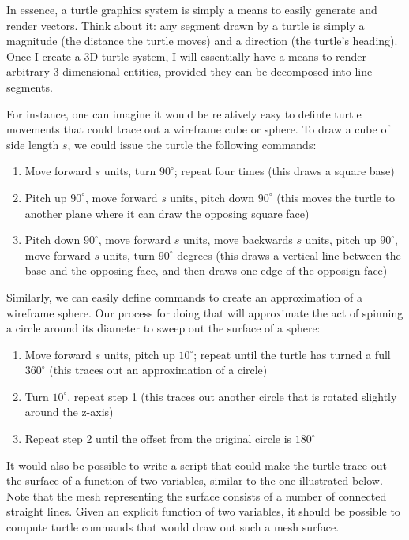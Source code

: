 \documentclass[12pt]{article}
\begin{document}
In essence, a turtle graphics system is simply a means to easily generate and render vectors. Think about it: any segment drawn by a turtle is simply a magnitude (the distance the turtle moves) and a direction (the turtle's heading). Once I create a 3D turtle system, I will essentially have a means to render arbitrary 3 dimensional entities, provided they can be decomposed into line segments.

For instance, one can imagine it would be relatively easy to definte turtle movements that could trace out a wireframe cube or sphere. To draw a cube of side length $s$, we could issue the turtle the following commands: 

\begin{enumerate}
\item Move forward $s$ units, turn $90^\circ$; repeat four times (this draws a square base)
\item Pitch up $90^\circ$, move forward $s$ units, pitch down $90^\circ$ (this moves the turtle to another plane where it can draw the opposing square face)
\item Pitch down $90^\circ$, move forward $s$ units, move backwards $s$ units, pitch up $90^\circ$, move forward $s$ units, turn $90^\circ$ degrees (this draws a vertical line between the base and the opposing face, and then draws one edge of the opposign face)
\end{enumerate}

Similarly, we can easily define commands to create an approximation of a wireframe sphere. Our process for doing that will approximate the act of spinning a circle around its diameter to sweep out the surface of a sphere:

\begin{enumerate}
\item Move forward $s$ units, pitch up $10^\circ$; repeat until the turtle has turned a full $360^\circ$ (this traces out an approximation of a circle)
\item Turn $10^\circ$, repeat step 1 (this traces out another circle that is rotated slightly around the z-axis)
\item Repeat step 2 until the offset from the original circle is $180^\circ$
\end{enumerate}

It would also be possible to write a script that could make the turtle trace out the surface of a function of two variables, similar to the one illustrated below. Note that the mesh representing the surface consists of a number of connected straight lines. Given an explicit function of two variables, it should be possible to compute turtle commands that would draw out such a mesh surface.
\end{document}
